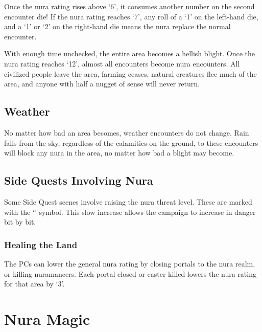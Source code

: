 \begin{multicols}{2}
Once the nura rating rises above `6', it consumes another number on the second encounter die!
If the nura rating reaches `7', any roll of a `1' on the left-hand die, and a `1' or `2' on the right-hand die means the nura replace the normal encounter.

With enough time unchecked, the entire area becomes a hellish \gls{blight}.
Once the nura rating reaches `12', almost all encounters become nura encounters.
All civilized people leave the area, farming ceases, natural creatures flee much of the area, and anyone with half a nugget of sense will never return.

\subsection{Weather}

No matter how bad an area becomes, weather encounters do not change.
Rain falls from the sky, regardless of the calamities on the ground, to these encounters will block any nura in the area, no matter how bad a \gls{blight} may become.

\subsection{Side Quests Involving Nura}
Some Side Quest scenes involve raising the nura threat level.
These are marked with the `\N' symbol.
This slow increase allows the campaign to increase in danger bit by bit.

\subsubsection{Healing the Land}

The PCs can lower the general nura rating by closing portals to the nura realm, or killing nuramancers.
Each portal closed or caster killed lowers the nura rating for that area by `3'.

\end{multicols}

\section{Nura Magic}\label{saurecanta}

